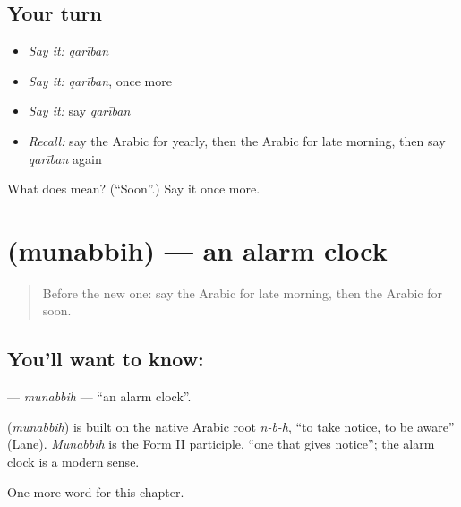 \subsection*{Your turn}
\begin{itemize}
\raggedright
  \item \emph{Say it:} \emph{qarīban}
  \item \emph{Say it:} \emph{qarīban}, once more
  \item \emph{Say it:} say \emph{qarīban}
  \item \emph{Recall:} say the Arabic for yearly, then the Arabic for late morning, then say \emph{qarīban} again
\end{itemize}

\begin{tcolorbox}[breakable,colback=teal!4,colframe=teal!35!black,title={Before you move on}]
What does  mean? (\textquotedblleft{}Soon\textquotedblright{}.) Say it once more.
\end{tcolorbox}
\section[\texorpdfstring{\ar{منبه} (munabbih)}{منبه (munabbih)}]{ (munabbih) — an alarm clock}

\label{lesson:AR-C234-munabbih}



\begin{quote}
Before the new one: say the Arabic for late morning, then the Arabic for soon.
\end{quote}

\subsection*{You'll want to know: }
\textbf{} — \emph{munabbih} — \textquotedblleft{}an alarm clock\textquotedblright{}.

\begin{cousinweb}
\textbf{} (\emph{munabbih}) is built on the native Arabic root \emph{n-b-h}, \textquotedblleft{}to take notice, to be aware\textquotedblright{} (Lane). \emph{Munabbih} is the Form II participle, \textquotedblleft{}one that gives notice\textquotedblright{}; the alarm clock is a modern sense.
\end{cousinweb}

\begin{grammarlens}[title={What you've built}]
One more word for this chapter.
\end{grammarlens}

